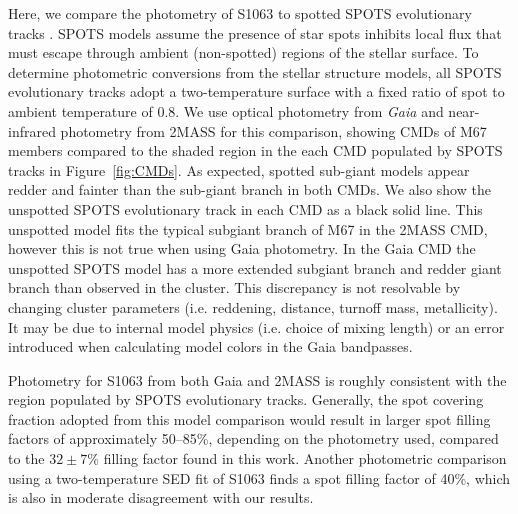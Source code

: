 \documentclass[trackchanges]{aastex631}
\begin{document}
Here, we compare the photometry of S1063 to spotted SPOTS evolutionary tracks \citep{somers20}. SPOTS models assume the presence of star spots inhibits local flux that must escape through ambient (non-spotted) regions of the stellar surface. To determine photometric conversions from the stellar structure models, all SPOTS evolutionary tracks adopt a two-temperature surface with a fixed ratio of spot to ambient temperature of 0.8. We use optical photometry from \textit{Gaia} and near-infrared photometry from 2MASS for this comparison, showing CMDs of M67 members compared to the shaded region in the each CMD populated by SPOTS tracks in Figure~\ref{fig:CMDs}. As expected, spotted sub-giant models appear redder and fainter than the sub-giant branch in both CMDs. We also show the unspotted SPOTS evolutionary track in each CMD as a black solid line. This unspotted model fits the typical subgiant branch of M67 in the 2MASS CMD, however this is not true when using Gaia photometry. In the Gaia CMD the unspotted SPOTS model has a more extended subgiant branch and redder giant branch than observed in the cluster. This discrepancy is not resolvable by changing cluster parameters (i.e. reddening, distance, turnoff mass, metallicity). It may be due to internal model physics (i.e. choice of mixing length) or an error introduced when calculating model colors in the Gaia bandpasses.

Photometry for S1063 from both Gaia and 2MASS is roughly consistent with the region populated by SPOTS evolutionary tracks. Generally, the spot covering fraction adopted from this model comparison would result in larger spot filling factors of approximately 50--85\%, depending on the photometry used, compared to the $32\pm7$\% filling factor found in this work. Another photometric comparison using a two-temperature SED fit of S1063 \citep{leiner17} finds a spot filling factor of 40\%, which is also in moderate disagreement with our results.



\end{document}
